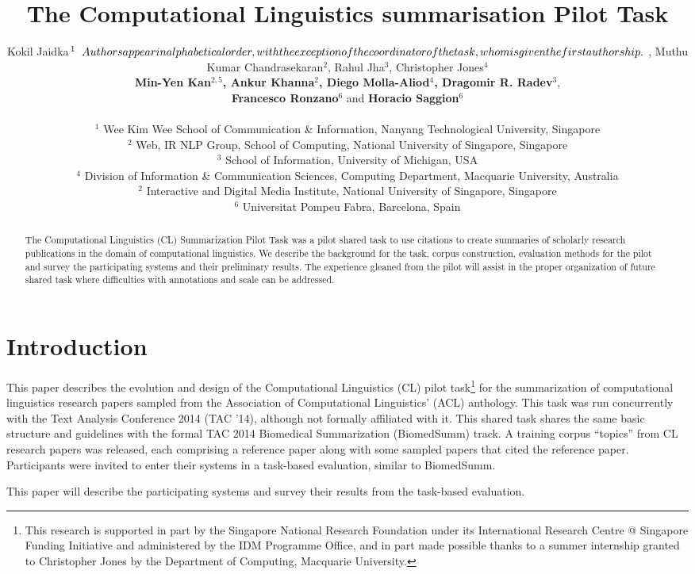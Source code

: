 \documentclass[11pt]{article}
\title{The Computational Linguistics summarisation Pilot Task}
\author{Kokil Jaidka$^{1}\relax{\hspace{.2cm}Authors appear in alphabetical order, with the exception of the coordinator of the task, whom is given the first authorship.} $ , Muthu Kumar Chandrasekaran$^{2}$, Rahul Jha$^{3}$, Christopher Jones$^{4}$ \\ {\bf Min-Yen Kan}$^{2,5}${\bf , Ankur Khanna}$^{2}${\bf , Diego Molla-Aliod}$^{4}${\bf , Dragomir R. Radev}$^{3}$, \\ {\bf Francesco Ronzano}$^{6}$ and {\bf Horacio Saggion}$^{6}$ \\ 
\\
$^1$ Wee Kim Wee School of Communication \& Information, Nanyang Technological University, Singapore \\
$^2$ Web, IR \/ NLP Group, School of Computing, National University of Singapore, Singapore \\
$^3$ School of Information, University of Michigan, USA\\
$^4$ Division of Information \& Communication Sciences, Computing Department, Macquarie University, Australia \\
$^2$ Interactive and Digital Media Institute, National University of Singapore, Singapore \\
$^6$ Universitat Pompeu Fabra, Barcelona, Spain }
\date{}
\begin{document}
\maketitle
\begin{abstract}
The Computational Linguistics (CL) Summarization Pilot Task was a
pilot shared task to use citations to create summaries of scholarly
research publications in the domain of computational linguistics.  We
describe the background for the task, corpus construction, evaluation
methods for the pilot and survey the participating systems and their
preliminary results.  The experience gleaned from the pilot will
assist in the proper organization of future shared task where
difficulties with annotations and scale can be addressed.
\end{abstract}

\section{Introduction}

This paper describes the evolution and design of the Computational
Linguistics (CL) pilot task\footnote{This research is supported in
  part by the Singapore National Research Foundation under its
  International Research Centre @ Singapore Funding Initiative and
  administered by the IDM Programme Office, and in part made possible
  thanks to a summer internship granted to Christopher Jones by the
  Department of Computing, Macquarie University.} for the
summarization of computational linguistics research papers sampled
from the Association of Computational Linguistics' (ACL)
anthology. This task was run concurrently with the Text Analysis
Conference 2014 (TAC '14), although not formally affiliated with it.
This shared task shares the same basic structure and guidelines with
the formal TAC 2014 Biomedical Summarization (BiomedSumm) track. A
training corpus ``topics'' from CL research papers was released, each
comprising a reference paper along with some sampled papers that cited
the reference paper. Participants were invited to enter their systems
in a task-based evaluation, similar to BiomedSumm.

This paper will describe the participating systems and survey their 
results from the task-based evaluation.
\end{document}
